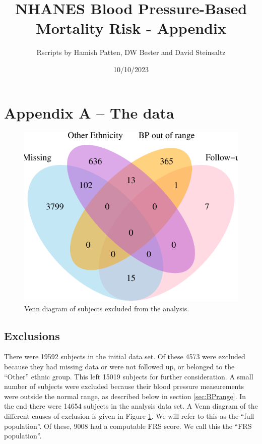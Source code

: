 \documentclass[
]{article}
\title{NHANES Blood Pressure-Based Mortality Risk - Appendix}
\author{Rscripts by Hamish Patten, DW Bester and David Steinsaltz}
\date{10/10/2023}
\begin{document}
\maketitle

{
\setcounter{tocdepth}{3}
\tableofcontents
}
\hypertarget{appendix-a-the-data}{%
\section{Appendix A -- The data}\label{appendix-a-the-data}}

\begin{figure}

{\centering \includegraphics{fig_test_files/figure-latex/Venn1-1} 

}

\caption{Venn diagram of subjects excluded from the analysis.}\label{fig:Venn1}
\end{figure}

\hypertarget{exclusions}{%
\subsection{Exclusions}\label{exclusions}}

There were 19592 subjects in the initial data set.
Of these 4573 were excluded because they had missing data or were not followed up, or belonged to the ``Other'' ethnic group.
This left 15019 subjects for further consideration.
A small number of subjects were excluded because their blood pressure measurements were outside the normal range, as described below in section \ref{sec:BPrange}.
In the end there were 14654 subjects in the analysis data set.
A Venn diagram of the different causes of exclusion is given in Figure \ref{fig:Venn1}.
We will refer to this as the ``full population''.
Of these, 9008 had a computable FRS score.
We call this the ``FRS population''.
\end{document}
